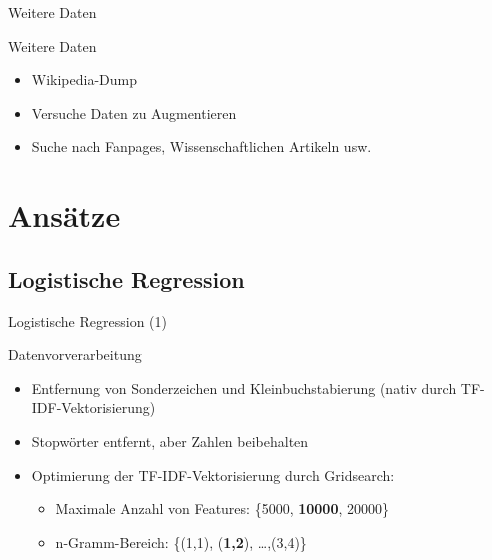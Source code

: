 \documentclass[aspectratio=169]{beamer} %
\begin{document}
\begin{frame}{Weitere Daten}
    \begin{block}{Weitere Daten}
        \begin{itemize}
            \item Wikipedia-Dump
            \item Versuche Daten zu Augmentieren
            \item Suche nach Fanpages, Wissenschaftlichen Artikeln usw.
        \end{itemize}
    \end{block}
\end{frame}


\section{Ans\"atze}

\subsection{Logistische Regression}

\begin{frame}{Logistische Regression (1)}
    \begin{block}{Datenvorverarbeitung}
        \begin{itemize}
            \item Entfernung von Sonderzeichen und Kleinbuchstabierung (nativ durch TF-IDF-Vektorisierung)
            \item Stopw\"orter entfernt, aber Zahlen beibehalten
            \item Optimierung der TF-IDF-Vektorisierung durch Gridsearch:
                  \begin{itemize}
                      \item Maximale Anzahl von Features: \{5000, \textbf{10000}, 20000\}
                      \item n-Gramm-Bereich: \{(1,1), (\textbf{1,2}), \dots ,(3,4)\}
                  \end{itemize}
        \end{itemize}
    \end{block}
\end{frame}
\end{document}
